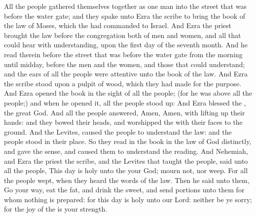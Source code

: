  All the people gathered themselves together as one man into the street that was before the water gate; and they spake unto Ezra the scribe to bring the book of the law of Moses, which the  had commanded to Israel. And Ezra the priest brought the law before the congregation both of men and women, and all that could hear with understanding, upon the first day of the seventh month. And he read therein before the street that was before the water gate from the morning until midday, before the men and the women, and those that could understand; and the ears of all the people were attentive unto the book of the law. And Ezra the scribe stood upon a pulpit of wood, which they had made for the purpose. And Ezra opened the book in the sight of all the people; (for he was above all the people;) and when he opened it, all the people stood up: And Ezra blessed the , the great God. And all the people answered, Amen, Amen, with lifting up their hands: and they bowed their heads, and worshipped the  with their faces to the ground. And the Levites, caused the people to understand the law: and the people stood in their place. So they read in the book in the law of God distinctly, and gave the sense, and caused them to understand the reading. And Nehemiah, and Ezra the priest the scribe, and the Levites that taught the people, said unto all the people, This day is holy unto the  your God; mourn not, nor weep. For all the people wept, when they heard the words of the law. Then he said unto them, Go your way, eat the fat, and drink the sweet, and send portions unto them for whom nothing is prepared: for this day is holy unto our Lord: neither be ye sorry; for the joy of the  is your strength.


